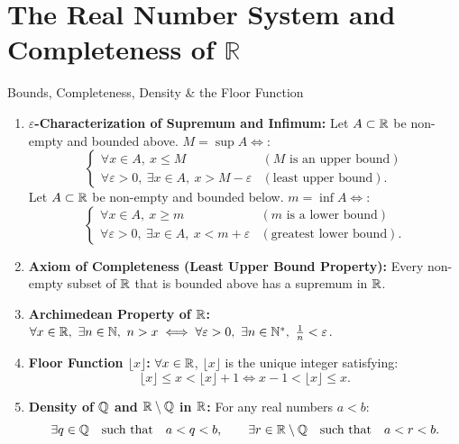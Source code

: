 \chapter{The Real Number System and Completeness of $\mathbb{R}$}
\label{chap:exo_ch03}

\begin{quicksummary}{Bounds, Completeness, Density \& the Floor Function}
\begin{enumerate}[leftmargin=1.4em,itemsep=3pt]
  \item \textbf{$\varepsilon$-Characterization of Supremum and Infimum:}
  Let $A \subset \mathbb{R}$ be non-empty and bounded above. $M = \sup A \iff$:
  \[
  \begin{cases}
  \forall x \in A,\ x \le M & (M \text{ is an upper bound}) \\
  \forall \varepsilon > 0,\ \exists x \in A,\ x > M - \varepsilon & (\text{least upper bound}).
  \end{cases}
  \]
  Let $A \subset \mathbb{R}$ be non-empty and bounded below. $m = \inf A \iff$:
  \[
  \begin{cases}
  \forall x \in A,\ x \ge m & (m \text{ is a lower bound}) \\
  \forall \varepsilon > 0,\ \exists x \in A,\ x < m + \varepsilon & (\text{greatest lower bound}).
  \end{cases}
  \]
  \item \textbf{Axiom of Completeness (Least Upper Bound Property):}
  Every non-empty subset of $\mathbb{R}$ that is bounded above has a supremum in $\mathbb{R}$.
  \item \textbf{Archimedean Property of $\mathbb{R}$:}
  $\forall x \in \mathbb{R},\ \exists n \in \mathbb{N},\ n > x \iff \forall \varepsilon > 0,\ \exists n \in \mathbb{N}^*,\ \frac{1}{n} < \varepsilon$.
  \item \textbf{Floor Function $\lfloor x \rfloor$:}
  $\forall x \in \mathbb{R}$, $\lfloor x \rfloor$ is the unique integer satisfying:
  \[
  \lfloor x \rfloor \le x < \lfloor x \rfloor + 1 \iff x - 1 < \lfloor x \rfloor \le x.
  \]
  \item \textbf{Density of $\mathbb{Q}$ and $\mathbb{R} \setminus \mathbb{Q}$ in $\mathbb{R}$:}
  For any real numbers $a < b$:
  \[
  \exists q \in \mathbb{Q} \quad \text{such that} \quad a < q < b, \qquad \exists r \in \mathbb{R} \setminus \mathbb{Q} \quad \text{such that} \quad a < r < b.
  \]
\end{enumerate}
\end{quicksummary}

\vspace{10pt}

